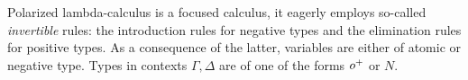 \documentclass[sigconf,screen,fleqn]{acmart} %
\begin{document}

Polarized lambda-calculus
\cite{zeilberger:PhD,espiritoSanto:entcs17}
is a focused calculus, it eagerly employs
so-called \emph{invertible} rules: the introduction rules for negative types and the
elimination rules for positive types.  As a consequence of the latter,
variables are either of atomic or negative type.
Types in contexts $\Gamma,\Delta$ are of one of the forms $o^+$ or $N$.
\end{document}
